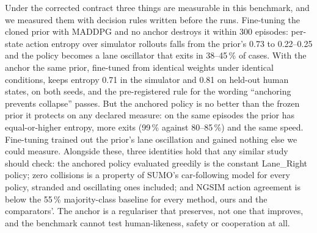 Under the corrected contract three things are measurable in this benchmark, and we measured them with decision rules written before the runs. Fine-tuning the cloned prior with MADDPG and no anchor destroys it within 300 episodes: per-state action entropy over simulator rollouts falls from the prior's 0.73 to 0.22--0.25 and the policy becomes a lane oscillator that exits in 38--45\,\% of cases. With the anchor the same prior, fine-tuned from identical weights under identical conditions, keeps entropy 0.71 in the simulator and 0.81 on held-out human states, on both seeds, and the pre-registered rule for the wording ``anchoring prevents collapse'' passes. But the anchored policy is no better than the frozen prior it protects on any declared measure: on the same episodes the prior has equal-or-higher entropy, more exits (99\,\% against 80--85\,\%) and the same speed. Fine-tuning trained out the prior's lane oscillation and gained nothing else we could measure. Alongside these, three identities hold that any similar study should check: the anchored policy evaluated greedily is the constant Lane\_Right policy; zero collisions is a property of SUMO's car-following model for every policy, stranded and oscillating ones included; and NGSIM action agreement is below the 55\,\% majority-class baseline for every method, ours and the comparators'. The anchor is a regulariser that preserves, not one that improves, and the benchmark cannot test human-likeness, safety or cooperation at all.

